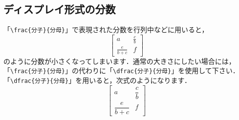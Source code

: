 \subsection{ディスプレイ形式の分数}
「\verb+\frac{分子}{分母}+」で表現された分数を行列中などに用いると，
\begin{equation}
	\left[ \begin{array}{cc}
		a & \frac{c}{b} \\
		\frac{e}{b + c} & f
	\end{array} \right]
\end{equation}
のように分数が小さくなってしまいます．通常の大きさにしたい場合には，「\verb+\frac{分子}{分母}+」の代わりに「\verb+\dfrac{分子}{分母}+」を使用して下さい．「\verb+\dfrac{分子}{分母}+」を用いると，次式のようになります．
\begin{equation}
	\left[ \begin{array}{cc}
		a & \dfrac{c}{b} \\
		\dfrac{e}{b + c} & f
	\end{array} \right]
\end{equation}
